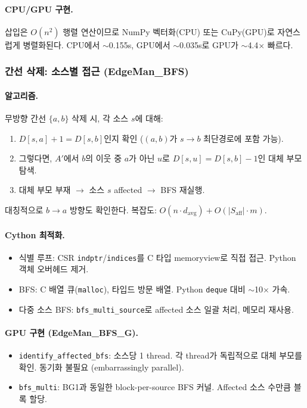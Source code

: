 \documentclass[11pt,a4paper]{article}
\begin{document}
\paragraph{CPU/GPU 구현.}
삽입은 $O(n^2)$ 행렬 연산이므로 NumPy 벡터화(CPU) 또는 CuPy(GPU)로 자연스럽게 병렬화된다. CPU에서 $\sim$0.155s, GPU에서 $\sim$0.035s로 GPU가 $\sim$4.4$\times$ 빠르다.

\subsubsection{간선 삭제: 소스별 접근 (EdgeMan\_BFS)}

\paragraph{알고리즘.}
무방향 간선 $\{a,b\}$ 삭제 시, 각 소스 $s$에 대해:
\begin{enumerate}[leftmargin=1.4em]
  \item $D[s,a]+1 = D[s,b]$인지 확인 ($(a,b)$가 $s \to b$ 최단경로에 포함 가능).
  \item 그렇다면, $A'$에서 $b$의 이웃 중 $a$가 아닌 $u$로 $D[s,u] = D[s,b]-1$인 대체 부모 탐색.
  \item 대체 부모 부재 $\to$ 소스 $s$ affected $\to$ BFS 재실행.
\end{enumerate}
대칭적으로 $b \to a$ 방향도 확인한다. 복잡도: $O(n \cdot d_{\text{avg}}) + O(|S_{\text{aff}}| \cdot m)$.

\paragraph{Cython 최적화.}
\begin{itemize}[leftmargin=1.4em]
  \item 식별 루프: CSR \texttt{indptr}/\texttt{indices}를 C 타입 memoryview로 직접 접근. Python 객체 오버헤드 제거.
  \item BFS: C 배열 큐(\texttt{malloc}), 타입드 방문 배열. Python \texttt{deque} 대비 $\sim$10$\times$ 가속.
  \item 다중 소스 BFS: \texttt{bfs\_multi\_source}로 affected 소스 일괄 처리, 메모리 재사용.
\end{itemize}

\paragraph{GPU 구현 (EdgeMan\_BFS\_G).}
\begin{itemize}[leftmargin=1.4em]
  \item \texttt{identify\_affected\_bfs}: 소스당 1 thread. 각 thread가 독립적으로 대체 부모를 확인. 동기화 불필요 (embarrassingly parallel).
  \item \texttt{bfs\_multi}: BG1과 동일한 block-per-source BFS 커널. Affected 소스 수만큼 블록 할당.
\end{itemize}
\end{document}
